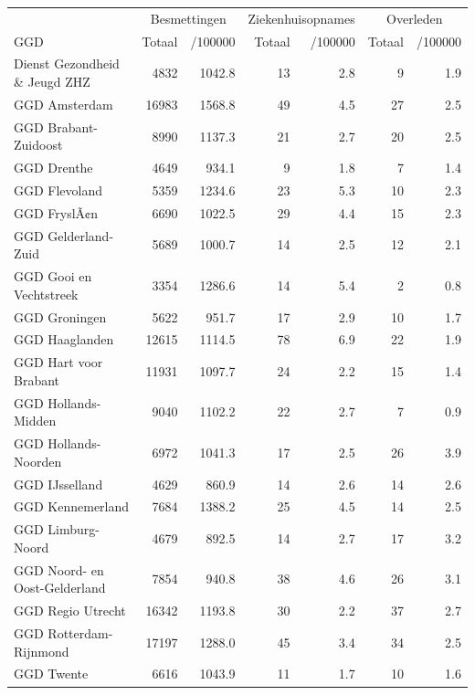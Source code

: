 \documentclass[
  english,
  man,floatsintext]{apa6}
\begin{document}
\begin{table}
\centering\begingroup\fontsize{10}{12}\selectfont

\begin{threeparttable}
\begin{tabular}{lrrrrrr}
\toprule
\multicolumn{1}{c}{ } & \multicolumn{2}{c}{Besmettingen} & \multicolumn{2}{c}{Ziekenhuisopnames} & \multicolumn{2}{c}{Overleden} \\
\cmidrule(l{3pt}r{3pt}){2-3} \cmidrule(l{3pt}r{3pt}){4-5} \cmidrule(l{3pt}r{3pt}){6-7}
GGD & Totaal & /100000 & Totaal & /100000 & Totaal & /100000\\
\midrule
Dienst Gezondheid \& Jeugd ZHZ & 4832 & 1042.8 & 13 & 2.8 & 9 & 1.9\\
GGD Amsterdam & 16983 & 1568.8 & 49 & 4.5 & 27 & 2.5\\
GGD Brabant-Zuidoost & 8990 & 1137.3 & 21 & 2.7 & 20 & 2.5\\
GGD Drenthe & 4649 & 934.1 & 9 & 1.8 & 7 & 1.4\\
GGD Flevoland & 5359 & 1234.6 & 23 & 5.3 & 10 & 2.3\\
GGD FryslÃ¢n & 6690 & 1022.5 & 29 & 4.4 & 15 & 2.3\\
GGD Gelderland-Zuid & 5689 & 1000.7 & 14 & 2.5 & 12 & 2.1\\
GGD Gooi en Vechtstreek & 3354 & 1286.6 & 14 & 5.4 & 2 & 0.8\\
GGD Groningen & 5622 & 951.7 & 17 & 2.9 & 10 & 1.7\\
GGD Haaglanden & 12615 & 1114.5 & 78 & 6.9 & 22 & 1.9\\
GGD Hart voor Brabant & 11931 & 1097.7 & 24 & 2.2 & 15 & 1.4\\
GGD Hollands-Midden & 9040 & 1102.2 & 22 & 2.7 & 7 & 0.9\\
GGD Hollands-Noorden & 6972 & 1041.3 & 17 & 2.5 & 26 & 3.9\\
GGD IJsselland & 4629 & 860.9 & 14 & 2.6 & 14 & 2.6\\
GGD Kennemerland & 7684 & 1388.2 & 25 & 4.5 & 14 & 2.5\\
GGD Limburg-Noord & 4679 & 892.5 & 14 & 2.7 & 17 & 3.2\\
GGD Noord- en Oost-Gelderland & 7854 & 940.8 & 38 & 4.6 & 26 & 3.1\\
GGD Regio Utrecht & 16342 & 1193.8 & 30 & 2.2 & 37 & 2.7\\
GGD Rotterdam-Rijnmond & 17197 & 1288.0 & 45 & 3.4 & 34 & 2.5\\
GGD Twente & 6616 & 1043.9 & 11 & 1.7 & 10 & 1.6\\

\end{tabular}
\end{threeparttable}
\end{table}
\end{document}
